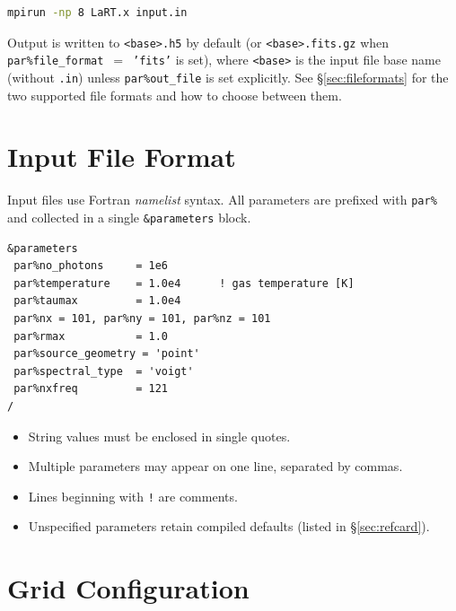 \documentclass[english,a4paper]{my_memo}
\newcommand{\parm}[1]{\texttt{par\%#1}}
\begin{document}
\begin{lstlisting}[language=bash,numbers=none]
mpirun -np 8 LaRT.x input.in
\end{lstlisting}

\begin{sloppypar}
Output is written to \texttt{<base>.h5} by default (or \texttt{<base>.fits.gz}
when \parm{file\_format}~$=$~\texttt{'fits'} is set), where \texttt{<base>} is
the input file base name (without \texttt{.in}) unless \parm{out\_file} is set
explicitly.  See \S\ref{sec:fileformats} for the two supported file formats
and how to choose between them.
\end{sloppypar}

\section{Input File Format}

Input files use Fortran \emph{namelist} syntax.  All parameters are prefixed with
\texttt{par\%} and collected in a single \texttt{\&parameters} block.

\begin{lstlisting}
&parameters
 par%no_photons     = 1e6
 par%temperature    = 1.0e4      ! gas temperature [K]
 par%taumax         = 1.0e4
 par%nx = 101, par%ny = 101, par%nz = 101
 par%rmax           = 1.0
 par%source_geometry = 'point'
 par%spectral_type  = 'voigt'
 par%nxfreq         = 121
/
\end{lstlisting}

\begin{itemize}
  \item String values must be enclosed in single quotes.
  \item Multiple parameters may appear on one line, separated by commas.
  \item Lines beginning with \texttt{!} are comments.
  \item Unspecified parameters retain compiled defaults (listed in \S\ref{sec:refcard}).
\end{itemize}

\section{Grid Configuration}
\label{sec:grid}
\end{document}
